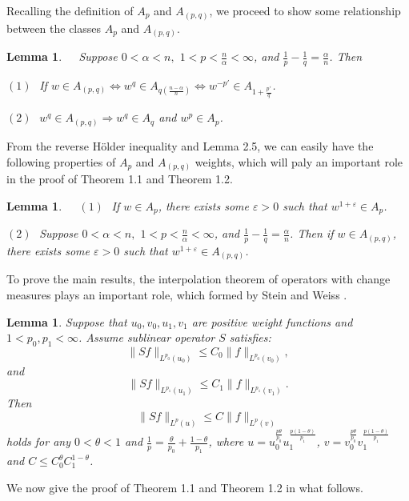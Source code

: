 \documentclass[reqno,12pt]{amsart}
\numberwithin{equation}{section}
\theoremstyle{plain}
\newtheorem{lemma}[theorem]{\indent\sc Lemma}
\theoremstyle{definition}
\begin{document}
Recalling the definition of $A_{p}$ and $A_{(p,q)}$, we proceed to show some relationship between the classes $A_{p}$ and $A_{(p,q)}$.
\begin{lemma}\,\,\,\,\cite{LDY}\,
Suppose $0<\alpha<n,$ $1<p<\frac{n}{\alpha}<\infty$, and $\frac{1}{p}-\frac{1}{q}=\frac{\alpha}{n}$. Then

$\mathrm{(1)}$\,\, If $w\in A_{(p,q)}\Longleftrightarrow w^{q}\in A_{q(\frac{n-\alpha}{n})}\Longleftrightarrow w^{-p'}\in A_{1+\frac{p'}{q}}$.

$\mathrm{(2)}$\,\, $w^{q}\in A_{(p,q)}\Longrightarrow w^{q}\in A_{q}$ and $w^{p}\in A_{p}$.

\end{lemma}
From the reverse H\"{o}lder inequality and Lemma 2.5, we can easily have the following properties of $A_{p}$ and $A_{(p,q)}$ weights, which will paly an important role in the proof of Theorem 1.1 and Theorem 1.2.
\begin{lemma}\,\,\,\,\cite{LDY}\,
$\mathrm{(1)}$\,\, If $w\in A_{p}$, there exists some $\varepsilon>0$ such that $w^{1+\varepsilon}\in A_{p}$.

$\mathrm{(2)}$\,\, Suppose $0<\alpha<n,$ $1<p<\frac{n}{\alpha}<\infty$, and $\frac{1}{p}-\frac{1}{q}=\frac{\alpha}{n}$. Then if $w\in A_{(p,q)}$, there exists some $\varepsilon>0$ such that $w^{1+\varepsilon}\in A_{(p,q)}$.
\end{lemma}
To prove the main results, the interpolation theorem of operators with change measures plays an important role, which formed by Stein and Weiss \cite{SW}.
\begin{lemma}
Suppose that $u_{0},v_{0},u_{1},v_{1}$ are positive weight functions and $1<p_{0},p_{1}<\infty$. Assume sublinear operator $S$ satisfies:
$$\|Sf\|_{L^{p_{0}}(u_{0})}\leq C_{0}\|f\|_{L^{p_{0}}(v_{0})},$$
and
$$\|Sf\|_{L^{p_{1}}(u_{1})}\leq C_{1}\|f\|_{L^{p_{1}}(v_{1})}.$$
Then
$$\|Sf\|_{L^{p}(u)}\leq C\|f\|_{L^{p}(v)}$$
holds for any $0<\theta<1$ and $\frac{1}{p}=\frac{\theta}{p_{0}}+\frac{1-\theta}{p_{1}}$, where
$u=u_{0}^{\frac{p\theta}{p_{0}}}u_{1}^{\frac{p(1-\theta)}{p_{1}}}$, $v=v_{0}^{\frac{p\theta}{p_{0}}}v_{1}^{\frac{p(1-\theta)}{p_{1}}}$ and $C\leq C_{0}^{\theta}C_{1}^{1-\theta}$.
\end{lemma}

We now give the proof of Theorem 1.1 and Theorem 1.2 in what follows.
\end{document}
